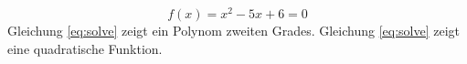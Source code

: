 \documentclass[12pt,a5paper]{book}
\begin{document}
\begin{equation} \label{eq:solve}
	f(x) = x^2 - 5 x + 6 = 0
\end{equation}
Gleichung \ref{eq:solve} zeigt ein Polynom zweiten Grades. 
Gleichung \eqref{eq:solve} zeigt eine quadratische Funktion. 
\end{document}
